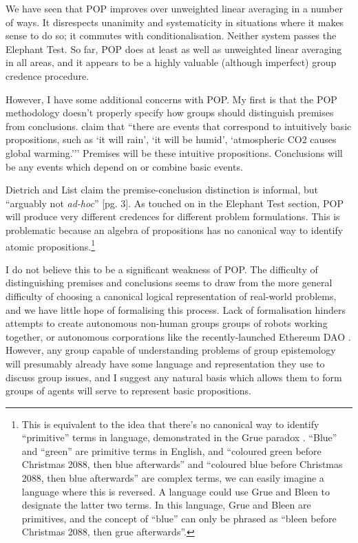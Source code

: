 \documentclass{article}
\begin{document}
We have seen that POP improves over unweighted linear averaging in a number of ways. It disrespects unanimity and systematicity in situations where it makes sense to do so; it commutes with conditionalisation. Neither system passes the Elephant Test. So far, POP does at least as well as unweighted linear averaging in all areas, and it appears to be a highly valuable (although imperfect) group credence procedure.

However, I have some additional concerns with POP. My first is that the POP methodology doesn't properly specify how groups should distinguish premises from conclusions. \citet[pg. 2]{dietrich2013probabilistic} claim that ``there are events that correspond to intuitively basic propositions, such as `it will rain', `it will be humid', `atmospheric CO2 causes global warming.{'}'' Premises will be these intuitive propositions. Conclusions will be any events which depend on or combine basic events.

Dietrich and List claim the premise-conclusion distinction is informal, but ``arguably not \textit{ad-hoc}'' [pg. 3]. As touched on in the Elephant Test section, POP will produce very different credences for different problem formulations. This is problematic because an algebra of propositions has no canonical way to identify atomic propositions.\footnote{This is equivalent to the idea that there's no canonical way to identify ``primitive'' terms in language, demonstrated in the Grue paradox \citep{goodman1983fact}. ``Blue'' and ``green'' are primitive terms in English, and ``coloured green before Christmas 2088, then blue afterwards'' and ``coloured blue before Christmas 2088, then blue afterwards'' are complex terms, we can easily imagine a language where this is reversed. A language could use Grue and Bleen to designate the latter two terms. In this language, Grue and Bleen are primitives, and the concept of ``blue'' can only be phrased as ``bleen before Christmas 2088, then grue afterwards''.} 

I do not believe this to be a significant weakness of POP. The difficulty of distinguishing premises and conclusions seems to draw from the more general difficulty of choosing a canonical logical representation of real-world problems, and we have little hope of formalising this process. Lack of formalisation hinders attempts to create autonomous non-human groups \textemdash{} groups of robots working together, or autonomous corporations like the recently-launched Ethereum DAO \textemdash{}. However, any group capable of understanding problems of group epistemology will presumably already have some language and representation they use to discuss group issues, and I suggest any natural basis which allows them to form groups of agents will serve to represent basic propositions.
\end{document}

